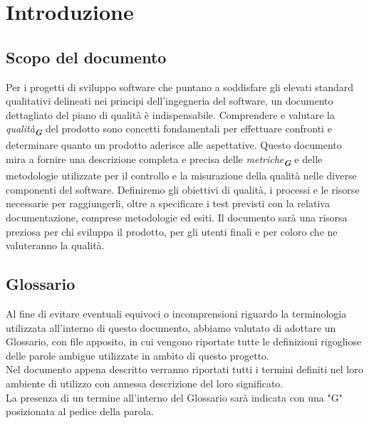 



\section{Introduzione}
\label{sec:introduzione}

\subsection{Scopo del documento}
Per i progetti di sviluppo software che puntano a soddisfare gli elevati 
standard qualitativi delineati nei principi dell'ingegneria del software, 
un documento dettagliato del piano di qualità è indispensabile.
Comprendere e valutare la \emph{qualità}\textsubscript{\textit{\textbf{G}}} 
del prodotto sono concetti fondamentali 
per effettuare confronti e determinare quanto un prodotto aderisce alle aspettative.
Questo documento mira a fornire una descrizione completa e precisa delle 
\emph{metriche}\textsubscript{\textit{\textbf{G}}} e delle 
metodologie utilizzate per il controllo e la misurazione 
della qualità nelle diverse componenti del software.
Definiremo gli obiettivi di qualità, i processi e le risorse necessarie per 
raggiungerli, oltre a specificare i test previsti con la relativa documentazione, 
comprese metodologie ed esiti.
Il documento sarà una risorsa preziosa per chi sviluppa il prodotto, per gli 
utenti finali e per coloro che ne valuteranno la qualità.

\subsection{Glossario}
Al fine di evitare eventuali equivoci o incomprensioni riguardo la terminologia 
utilizzata all’interno di questo documento, 
abbiamo valutato di adottare un Glossario, con file apposito, in cui
vengono riportate tutte le definizioni rigogliose delle parole ambigue utilizzate 
in ambito di
questo progetto.\\
Nel documento appena descritto verranno riportati tutti i termini definiti nel
loro ambiente di utilizzo con annessa descrizione del loro significato.\\
La presenza di un termine all'interno del Glossario sarà indicata con una "G" 
posizionata al pedice della parola.

